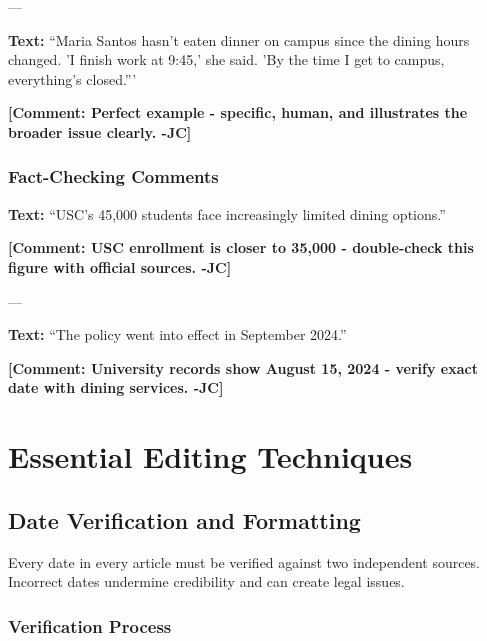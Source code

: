 \documentclass[12pt]{article}
\begin{document}
---

\begin{examplebox}
\textbf{Text:} ``Maria Santos hasn't eaten dinner on campus since the dining hours changed. 'I finish work at 9:45,' she said. 'By the time I get to campus, everything's closed.'''

\textbf{\textcolor{atlantic}{[Comment: Perfect example - specific, human, and illustrates the broader issue clearly. -JC]}}
\end{examplebox}

\subsubsection{Fact-Checking Comments}

\begin{examplebox}
\textbf{Text:} ``USC's 45,000 students face increasingly limited dining options.''

\textbf{\textcolor{atlantic}{[Comment: USC enrollment is closer to 35,000 - double-check this figure with official sources. -JC]}}
\end{examplebox}

---

\begin{examplebox}
\textbf{Text:} ``The policy went into effect in September 2024.''

\textbf{\textcolor{atlantic}{[Comment: University records show August 15, 2024 - verify exact date with dining services. -JC]}}
\end{examplebox}



\newpage

\section{Essential Editing Techniques}
\label{sec:micro-skills}

\subsection{Date Verification and Formatting}
\label{sec:date-verification}

Every date in every article must be verified against two independent sources. Incorrect dates undermine credibility and can create legal issues.

\subsubsection{Verification Process}
\end{document}
